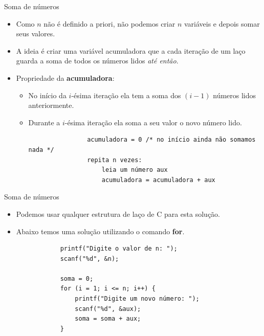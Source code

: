 \documentclass[handout]{beamer}
\begin{document}
\begin{frame}[fragile]{Soma de números}

    \begin{itemize}[<+->]
        \item Como $n$ não é definido a priori, não podemos criar $n$ variáveis e depois somar seus valores.
        \item A ideia é criar uma variável acumuladora que a cada iteração de um laço guarda a soma de todos os números lidos \textit{até então}.
        \item Propriedade da {\bf acumuladora}:
        \begin{itemize}
            \item No início da $i$-ésima iteração ela tem a soma dos $(i-1)$ números lidos anteriormente.
            \item Durante a $i$-ésima iteração ela soma a seu valor o novo número lido.

            \begin{verbatim}
                acumuladora = 0 /* no início ainda não somamos nada */
                repita n vezes:
                    leia um número aux
                    acumuladora = acumuladora + aux
            \end{verbatim}
        \end{itemize}
    \end{itemize}
\end{frame}

\begin{frame}[fragile]{Soma de números}

    \begin{itemize}
        \item Podemos usar qualquer estrutura de laço de C para esta solução.
        \item Abaixo temos uma solução utilizando o comando {\bf for}.

        \begin{verbatim}
            printf("Digite o valor de n: ");
            scanf("%d", &n);

            soma = 0;
            for (i = 1; i <= n; i++) {
                printf("Digite um novo número: ");
                scanf("%d", &aux);
                soma = soma + aux;
            }
        \end{verbatim}
    \end{itemize}
\end{frame}
\end{document}
